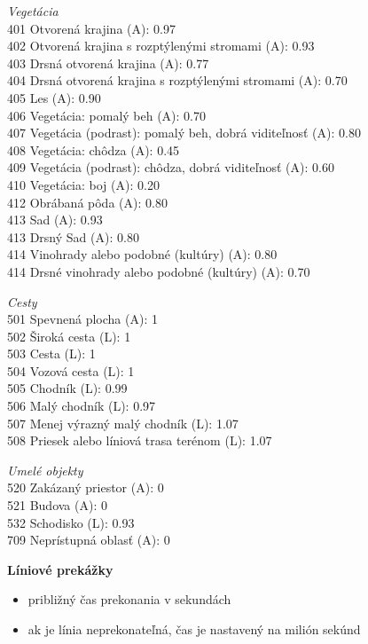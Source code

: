 \documentclass[12pt,a4paper]{report}
\begin{document}
\textit{Vegetácia}\\
401 Otvorená krajina (A): 0.97\\
402 Otvorená krajina s rozptýlenými stromami (A): 0.93\\
403 Drsná otvorená krajina (A): 0.77\\
404 Drsná otvorená krajina s rozptýlenými stromami (A): 0.70\\
405 Les (A): 0.90\\
406 Vegetácia: pomalý beh (A): 0.70\\
407 Vegetácia (podrast): pomalý beh, dobrá viditeľnosť (A): 0.80\\
408 Vegetácia: chôdza (A): 0.45\\
409 Vegetácia (podrast): chôdza, dobrá viditeľnosť (A): 0.60\\
410 Vegetácia: boj (A): 0.20\\
412 Obrábaná pôda (A): 0.80\\
413 Sad (A): 0.93\\
413 Drsný Sad (A): 0.80\\
414 Vinohrady alebo podobné (kultúry) (A): 0.80\\
414 Drsné vinohrady alebo podobné (kultúry) (A): 0.70

\textit{Cesty}\\
501 Spevnená plocha (A): 1\\
502 Široká cesta (L): 1\\
503 Cesta (L): 1\\
504 Vozová cesta (L): 1\\
505 Chodník (L): 0.99\\
506 Malý chodník (L): 0.97\\
507 Menej výrazný malý chodník (L): 1.07\\
508 Priesek alebo líniová trasa terénom (L): 1.07

\textit{Umelé objekty}\\
520 Zakázaný priestor (A): 0\\
521 Budova (A): 0\\
532 Schodisko (L): 0.93\\
709 Neprístupná oblasť (A): 0

\bigskip

\textbf{Líniové prekážky}

\begin{itemize}
    \item približný čas prekonania v sekundách
    \item ak je línia neprekonateľná, čas je nastavený na milión sekúnd
\end{itemize}
\end{document}
